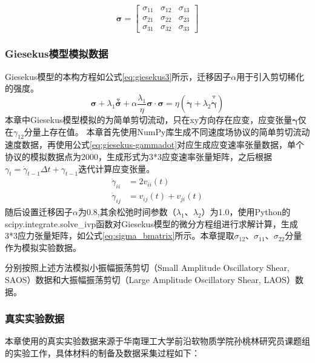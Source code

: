 \begin{equation}
  \boldsymbol{\sigma} = \begin{bmatrix}
    \sigma_{11} & \sigma_{12} & \sigma_{13} \\
    \sigma_{21} & \sigma_{22} & \sigma_{23} \\
    \sigma_{31} & \sigma_{32} & \sigma_{33}
  \end{bmatrix} \label{eq:sigma_bmatrix}
\end{equation}

\subsubsection{Giesekus模型模拟数据}
Giesekus模型的本构方程如公式\eqref{eq:giesekus3}所示，迁移因子$\alpha$用于引入剪切稀化的强度。
\begin{equation}
  \boldsymbol{\sigma} + \lambda_1 \stackrel{\triangledown}{\boldsymbol{\sigma}} + \alpha \frac{\lambda_1}{\eta} \boldsymbol{\sigma} \cdot \boldsymbol{\sigma} = \eta \left( \dot{\boldsymbol{\gamma}} + \lambda_2 \stackrel{\triangledown}{\dot{\boldsymbol{\gamma}}} \right) \label{eq:giesekus3}
\end{equation}
本章中Giesekus模型模拟的为简单剪切流动，只在xy方向存在应变，应变张量$\boldsymbol{\gamma}$仅在$\gamma_{12}$分量上存在值。
本章首先使用NumPy库生成不同速度场协议的简单剪切流动速度数据，再使用公式\eqref{eq:giesekus-gammadot}对应生成应变速率张量数据，单个协议的模拟数据点为2000，生成形式为3*3应变速率张量矩阵，之后根据$\gamma_{t}=\dot{\gamma}_{t-1}\Delta t+\gamma_{t-1}$迭代计算应变张量。
\begin{equation}
  \begin{aligned}
    \dot{\gamma}_{ii} & = 2 v_{ii}(t)           \\
    \dot{\gamma}_{ij} & = v_{ij}(t) + v_{ji}(t)
  \end{aligned} \label{eq:giesekus-gammadot}
\end{equation}
随后设置迁移因子$\alpha$为0.8,其余松弛时间参数（$\lambda_1$、$\lambda_2$）为1.0，使用Python的scipy.integrate.solve\_ivp函数对Giesekus模型的微分方程组进行求解计算，生成3*3应力张量矩阵，如公式\eqref{eq:sigma_bmatrix}所示。本章提取$\sigma_{12}$、$\sigma_{11}$、$\sigma_{22}$分量作为模拟实验数据。

分别按照上述方法模拟小振幅振荡剪切（Small Amplitude Oscillatory Shear, SAOS）数据和大振幅振荡剪切（Large Amplitude Oscillatory Shear, LAOS）数据。
\subsubsection{真实实验数据}
本章使用的真实实验数据来源于华南理工大学前沿软物质学院孙桃林研究员课题组的实验工作，具体材料的制备及数据采集过程如下：

